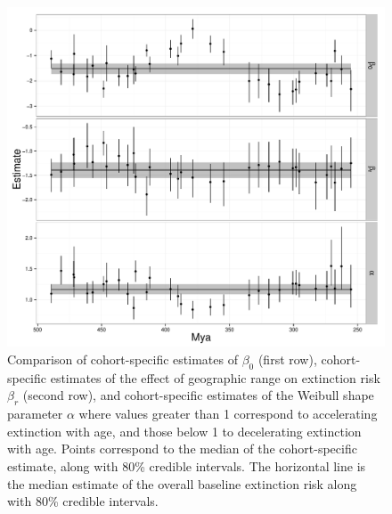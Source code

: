 \documentclass{article}
\begin{document}
\begin{figure}[ht]
  \centering
  \includegraphics[width = \textwidth,keepaspectratio=true]{figure/cohort_series}
  \caption{Comparison of cohort-specific estimates of \(\beta_{0}\) (first row), cohort-specific estimates of the effect of geographic range on extinction risk \(\beta_{r}\) (second row), and cohort-specific estimates of the Weibull shape parameter \(\alpha\) where values greater than 1 correspond to accelerating extinction with age, and those below 1 to decelerating extinction with age. Points correspond to the median of the cohort-specific estimate, along with 80\% credible intervals. The horizontal line is the median estimate of the overall baseline extinction risk along with 80\% credible intervals.}
  \label{fig:cohort_series}
\end{figure}
\end{document}
